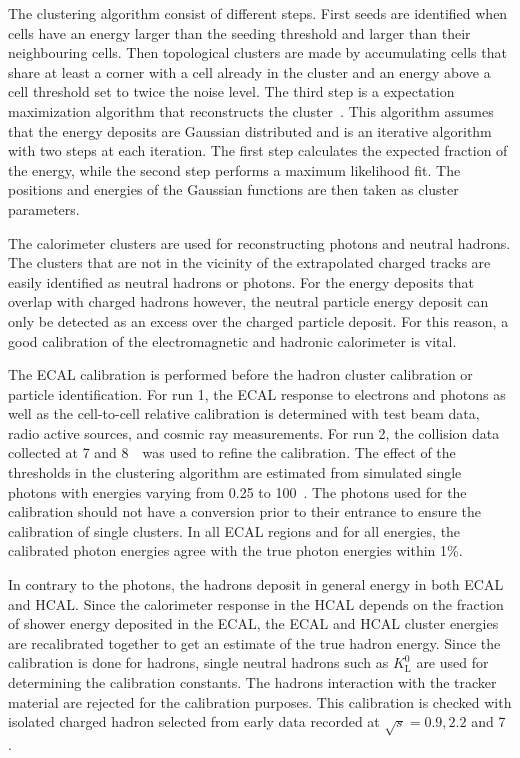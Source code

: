 The clustering algorithm consist of different steps. First seeds are identified when cells have an energy larger than the seeding threshold and larger than their neighbouring cells. Then topological clusters are made by accumulating cells that share at least a corner with a cell already in the cluster and an energy above a cell threshold set to twice the noise level. The third step is a expectation maximization algorithm that reconstructs the cluster~\cite{CMS-PRF-14-001}. This algorithm assumes that  the energy deposits are Gaussian distributed  and is an iterative algorithm with two steps at each iteration. The first step calculates the expected fraction of the energy, while the second step performs a maximum likelihood fit. The positions and energies of the Gaussian functions are then taken as cluster parameters. 

The calorimeter clusters are used for reconstructing photons and neutral hadrons. The  clusters that are not in the vicinity of the extrapolated charged tracks are easily identified as neutral hadrons or photons. For the energy deposits that overlap with charged hadrons however, the neutral particle energy deposit can only be detected as an excess over the charged particle deposit. For this reason, a good calibration of the electromagnetic and hadronic calorimeter is  vital. 

The ECAL calibration is performed before the hadron cluster calibration or particle identification. For run 1, the ECAL response to electrons and photons as well as the cell-to-cell relative calibration is determined with test beam data, radio active sources, and cosmic ray measurements. For run 2, the collision data collected at 7 and 8~\TeV\ was used to refine the calibration. The effect of the thresholds in the clustering algorithm are estimated from simulated single photons with energies varying from 0.25 to 100~\GeV. The photons used for the calibration should not have a conversion prior to their entrance to ensure the calibration of single clusters. In all ECAL regions and for all energies, the calibrated photon energies agree with the true photon energies within 1\%.

In contrary to the photons, the hadrons deposit in general energy in both ECAL and HCAL. Since the calorimeter response in the HCAL depends on the fraction of shower energy deposited in the ECAL, the ECAL and HCAL cluster energies are recalibrated together to get an estimate of the true hadron energy. Since the calibration is done for hadrons, single neutral hadrons such as $K_{\mathrm{L}}^0$ are used for determining the calibration constants. The hadrons interaction with the tracker material are rejected for the calibration purposes. This calibration is checked with isolated charged hadron selected from early data recorded at $\sqrt{s}=0.9, 2.2$ and 7 \TeV.  

